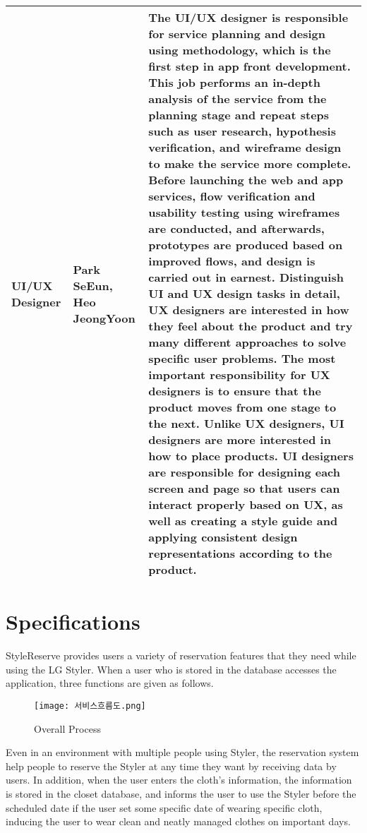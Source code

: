 \documentclass[conference]{IEEEtran}
\begin{document}
\begin{table}[htbp]
\begin{tabular}{| p{1cm}|p{1.5cm}|p{5.2cm} |}
\hline
UI/UX Designer & Park SeEun, Heo JeongYoon & The UI/UX designer is responsible for service planning and design using methodology, which is the first step in app front development. This job performs an in-depth analysis of the service from the planning stage and repeat steps such as user research, hypothesis verification, and wireframe design to make the service more complete. Before launching the web and app services, flow verification and usability testing using wireframes are conducted, and afterwards, prototypes are produced based on improved flows, and design is carried out in earnest.
Distinguish UI and UX design tasks in detail, UX designers are interested in how they feel about the product and try many different approaches to solve specific user problems. The most important responsibility for UX designers is to ensure that the product moves from one stage to the next. Unlike UX designers, UI designers are more interested in how to place products. UI designers are responsible for designing each screen and page so that users can interact properly based on UX, as well as creating a style guide and applying consistent design representations according to the product. \\
\hline

\end{tabular}
\end{table}

\section{Specifications}
StyleReserve provides users a variety of reservation features that they need while using the LG Styler. When a user who is stored in the database accesses the application, three functions are given as follows.

\begin{figure}[htbp]
\centerline{\texttt{[image: 서비스흐름도.png]}}
\caption{Overall Process}
\label{fig}
\end{figure}

Even in an environment with multiple people using Styler, the reservation system help people to reserve the Styler at any time they want by receiving data by users.
In addition, when the user enters the cloth's information, the information is stored in the closet database, and informs the user to use the Styler before the scheduled date if the user set some specific date of wearing specific cloth, inducing the user to wear clean and neatly managed clothes on important days.\\
\end{document}
